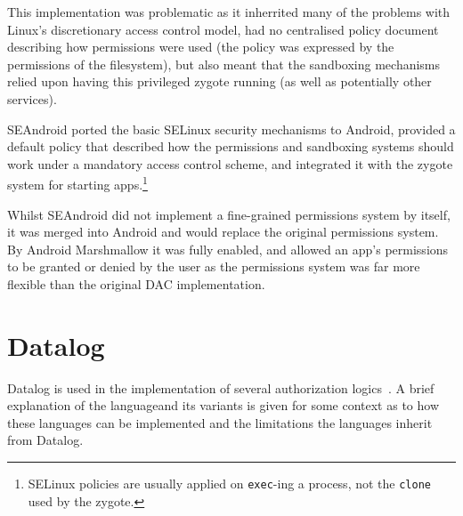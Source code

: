 \documentclass[thesis.tex]{subfiles}
\begin{document}
This implementation was problematic as it inherrited many of the
problems with Linux's discretionary access control model, had no
centralised policy document describing how permissions were used (the
policy was expressed by the permissions of the filesystem), but also
meant that the sandboxing mechanisms relied upon having this
privileged zygote running (as well as potentially other services).

SEAndroid ported the basic SELinux security mechanisms to Android,
provided a default policy that described how the permissions and
sandboxing systems should work under a mandatory access control
scheme, and integrated it with the zygote system for starting
apps.\footnote{SELinux policies are usually applied on
\texttt{exec}-ing a process, not the \texttt{clone} used by the
zygote.}

Whilst SEAndroid did not implement a fine-grained permissions system
by itself, it was merged into Android and would replace the original
permissions system.  By Android Marshmallow it was fully enabled, and
allowed an app's permissions to be granted or denied by the user as
the permissions system was far more flexible than the original DAC
implementation.

%

\section{Datalog}
\label{ssec:datalog}

Datalog is used in the implementation of several authorization
logics~\cite{detreville_binder_2002,li_distributed_2003,becker_secpal:_2010}. A brief explanation of the languageand its variants is given for some context as to how these languages
can be implemented and the limitations the languages inherit from
Datalog.
\end{document}
